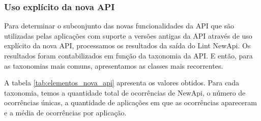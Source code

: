 \subsubsection{Uso explícito da nova API}

Para determinar o subconjunto das novas funcionalidades da API que são utilizadas
pelas aplicações com suporte a versões antigas da API através de uso explícito da
nova API, processamos os resultados da saída do Lint NewApi. Os resultados foram
contabilizados em função da taxonomia da API. E então, para as taxonomias mais
comuns, apresentamos as classes mais recorrentes.

A tabela \ref{tab:elementos_nova_api} apresenta os valores obtidos. Para cada
taxonomia, temos a quantidade total de ocorrências de NewApi, o número de
ocorrências únicas, a quantidade de aplicações em que as ocorrências apareceram
e a média de ocorrências por aplicação.

